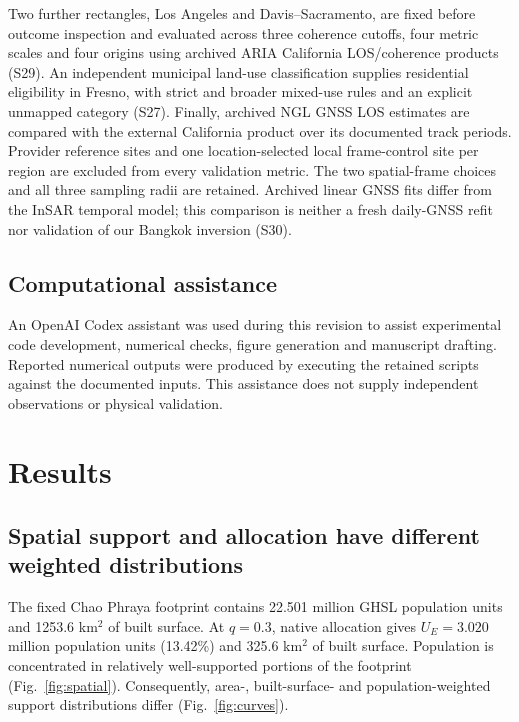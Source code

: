 \documentclass[pdflatex,sn-nature]{sn-jnl}
\newcommand{\PopThirty}{3.020}
\newcommand{\BuiltThirty}{325.6}
\newcommand{\PopPctThirty}{13.42}
\newcommand{\PopTotal}{22.501}
\newcommand{\BuiltTotal}{1253.6}
\providecommand{\DIFdel}[1]{{\protect\color{red} \scriptsize #1}} %
\providecommand{\DIFdelbegin}{} %
\providecommand{\DIFdelend}{} %
\begin{document}
Two further rectangles, Los Angeles and Davis--Sacramento, are fixed before outcome inspection and evaluated across three coherence cutoffs, four metric scales and four origins using archived ARIA California LOS/coherence products \citep{sangha2026california,sangha2026data} (S29). An independent municipal land-use classification supplies residential eligibility in Fresno, with strict and broader mixed-use rules and an explicit unmapped category \citep{fresno2026landuse} (S27). Finally, archived NGL GNSS LOS estimates are compared with the external California product over its documented track periods. Provider reference sites and one location-selected local frame-control site per region are excluded from every validation metric. The two spatial-frame choices and all three sampling radii are retained. Archived linear GNSS fits differ from the InSAR temporal model; this comparison is neither a fresh daily-GNSS refit nor validation of our Bangkok inversion (S30).


\DIFdelbegin \subsection{\DIFdel{Computational assistance}}
\addtocounter{subsection}{-1}%
\DIFdel{An OpenAI Codex assistant was used during this revision to assist experimental code development, numerical checks, figure generation and manuscript drafting. Reported numerical outputs were produced by executing the retained scripts against the documented inputs. This assistance does not supply independent observations or physical validation.
}%

\DIFdelend \section{Results}
\subsection{Spatial support and allocation have different weighted distributions}
The fixed Chao Phraya footprint contains \PopTotal{} million GHSL population units and \BuiltTotal{} km$^2$ of built surface. At $q=0.3$, native allocation gives $U_E=\PopThirty{}$ million population units (\PopPctThirty{}\%) and \BuiltThirty{} km$^2$ of built surface. Population is concentrated in relatively well-supported portions of the footprint (Fig.~\ref{fig:spatial}). Consequently, area-, built-surface- and population-weighted support distributions differ (Fig.~\ref{fig:curves}).
\end{document}
